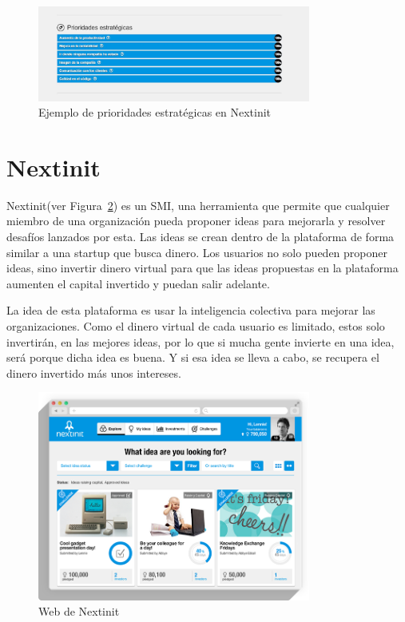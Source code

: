 \begin{figure}[!h]
	\begin{center}
		\includegraphics[width=0.8\textwidth]{./img/introduccion/prioridades.png}
		\caption{Ejemplo de prioridades estratégicas en Nextinit}
		\label{fig:prioridades}
	\end{center}
\end{figure}
 
 
 \section{Nextinit}
 
 Nextinit(ver Figura~\ref{fig:web}) es un \acs{SMI}, una herramienta que permite que cualquier miembro de una organización pueda
 proponer ideas para  mejorarla y resolver desafíos lanzados por esta. Las ideas se crean dentro de la 
 plataforma de forma similar a una startup que busca dinero. Los usuarios no solo pueden  proponer ideas, sino 
 invertir dinero virtual para que las ideas propuestas en la plataforma aumenten el capital invertido y 
 puedan salir adelante.
 
 La idea de esta plataforma es usar la inteligencia colectiva para mejorar las organizaciones. Como el dinero 
 virtual de cada usuario es limitado, estos solo invertirán,  en las mejores ideas, por lo que si mucha gente 
 invierte en una idea, será porque dicha idea es buena. Y si esa idea se lleva a cabo, se recupera el dinero 
 invertido  más unos intereses.
 
  \begin{figure}[!h]
 	\begin{center}
 		\includegraphics[width=0.8\textwidth]{./img/introduccion/nextinit.png}
 		\caption{Web de Nextinit}
 		\label{fig:web}
 	\end{center}
 \end{figure}
 
